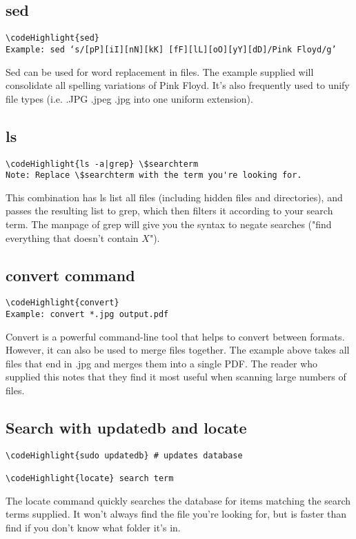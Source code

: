 \documentclass[12pt,a4paper]{article}
\begin{document}
\subsection{sed}  
\begin{Verbatim}[commandchars=\\\{\}]
\codeHighlight{sed}
Example: sed ‘s/[pP][iI][nN][kK] [fF][lL][oO][yY][dD]/Pink Floyd/g’
\end{Verbatim}
Sed can be used for word replacement in files.  The example supplied will consolidate all spelling variations of Pink Floyd.  It's also frequently used to unify file types (i.e. .JPG .jpeg .jpg into one uniform extension).

\subsection{ls}
\begin{Verbatim}[commandchars=\\\{\}]
\codeHighlight{ls -a|grep} \$searchterm
Note: Replace \$searchterm with the term you're looking for.
\end{Verbatim}
This combination has ls list all files (including hidden files and directories), and passes the resulting list to grep, which then filters it according to your search term.  The manpage of grep will give you the syntax to negate searches ("find everything that doesn't contain $X$").

\subsection{convert command}
\begin{Verbatim}[commandchars=\\\{\}]
\codeHighlight{convert}
Example: convert *.jpg output.pdf
\end{Verbatim}
Convert is a powerful command-line tool that helps to convert between formats.  However, it can also be used to merge files together.  The example above takes all files that end in .jpg and merges them into a single PDF.  The reader who supplied this notes that they find it most useful when scanning large numbers of files.

\subsection{Search with updatedb and locate}
\label{locate}
\begin{Verbatim}[commandchars=\\\{\}]
\codeHighlight{sudo updatedb} # updates database

\codeHighlight{locate} search term
\end{Verbatim}
The locate command quickly searches the database for items matching the search terms supplied.  It won't always find the file you're looking for, but is faster than find if you don't know what folder it's in.
\end{document}
